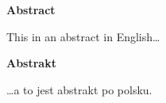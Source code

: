 \begin{center}
    \vspace*{0.5cm}
    {\Large \bfseries  Abstract}
\end{center}

 This in an abstract in English\ldots

\begin{center}
    \vspace*{1.5cm}
    {\Large \bfseries  Abstrakt}
\end{center}

\ldots a to jest abstrakt po polsku.
